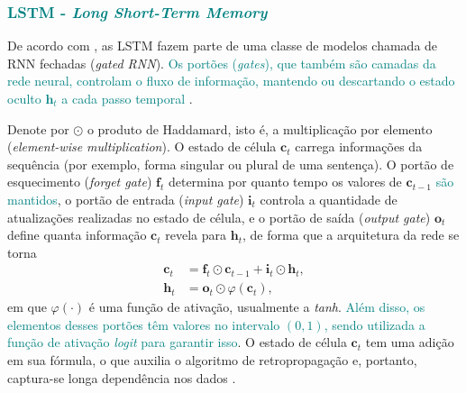 \documentclass{automatextcc}
\newcommand{\nico}[1]{\textcolor{teal}{#1}}
\newcommand{\bs}[1]{\boldsymbol{#1}}
\begin{document}
\subsubsection{\nico{LSTM - \textit{Long Short-Term Memory}}}
De acordo com \citet{goodfellow2016}, as LSTM fazem parte de uma classe de modelos chamada de RNN fechadas (\textit{gated RNN}). \nico{Os portões (\textit{gates}), que também são camadas da rede neural, controlam o fluxo de informação, mantendo ou descartando o estado oculto $\bs{h}_{t}$ a cada passo temporal \citep{kamath2019}}. 



Denote por $\odot$ o produto de Haddamard, isto é, a multiplicação por elemento (\textit{element-wise multiplication}). O estado de célula $\bs{c}_t$ carrega informações da sequência (por exemplo, forma singular ou plural de uma sentença). O portão de esquecimento (\textit{forget gate}) $\bs{f}_t$ determina por quanto tempo os valores de $\bs{c}_{t-1}$ \nico{são mantidos}, o portão de entrada (\textit{input gate}) $\bs{i}_t$ controla a quantidade de atualizações realizadas no estado de célula, e o portão de saída (\textit{output gate}) $\bs{o}_t$ define quanta informação $\bs{c}_t$ revela para $\bs{h}_t$, de forma que a arquitetura da rede se torna 
\begin{align*}
    \bs{c}_{t} & = \bs{f}_{t} \odot \bs{c}_{t-1} + \bs{i}_{t} \odot \bs{h}_{t}, \\
    \bs{h}_{t} & = \bs{o}_{t} \odot \varphi(\bs{c}_{t}),
\end{align*}
em que $\varphi(\cdot)$ é uma função de ativação, usualmente a \textit{tanh}. \nico{Além disso, os elementos desses portões têm valores no intervalo $(0,1)$, sendo utilizada a função de ativação \textit{logit} para garantir isso}. O estado de célula $\bs{c}_t$ tem uma adição em sua fórmula, o que auxilia o algoritmo de retropropagação e, portanto, captura-se longa dependência nos dados \citep{goodfellow2016, fan2021}.
\end{document}
